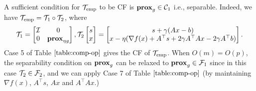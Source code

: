 {{\begin{remark}
\end{remark}
A sufficient condition for ${\mathcal{T}}_\textnormal{emp}$  to be CF is $\mathbf{prox}_g\in{\mathcal{C}}_1$ i.e., separable. Indeed, we have ${\mathcal{T}}_\textnormal{emp}={\mathcal{T}}_1\circ{\mathcal{T}}_2$, where $$\cT_1=\begin{bmatrix}
\cI & 0\\0&\prox_{\eta g}
\end{bmatrix}, \cT_2\begin{bmatrix}
s\\x
\end{bmatrix}=\begin{bmatrix}
s+\gamma (Ax-b)\\
x-\eta(\nabla f(x)+A^\top s+2\gamma A^\top Ax-2\gamma A^\top b)
\end{bmatrix}.$$
  Case 5 of Table $\ref{table:comp-op}$ gives the CF of ${\mathcal{T}}_\textnormal{emp}$. When $O(m)=O(p)$, the separability condition on $\mathbf{prox}_g$ can be relaxed to $\mathbf{prox}_g\in{\mathcal{F}}_1$ since in this case ${\mathcal{T}}_2\in{\mathcal{F}}_2$, and we can apply  Case 7 of Table $\ref{table:comp-op}$ (by maintaining $\nabla f(x)$, $A^\top s$, $Ax$ and $A^\top Ax$.)
}}
